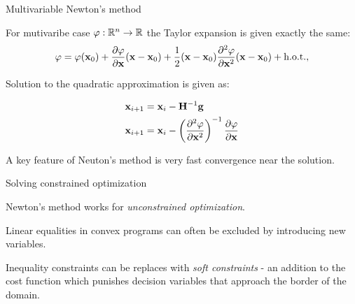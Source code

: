 \documentclass{beamer}
\begin{document}
\begin{frame}{Multivariable Newton's method}
	\begin{flushleft}
		
		For mutivaribe case $\varphi: \mathbb{R}^n \rightarrow \mathbb{R}$ the Taylor expansion is given exactly the same:
		\begin{equation}
			\varphi = \varphi(\mathbf{x}_0) + \frac{\partial \varphi}{\partial \mathbf{x}} (\mathbf{x} - \mathbf{x}_0)
			+ \frac{1}{2} (\mathbf{x} - \mathbf{x}_0) \frac{\partial^2 \varphi}{\partial \mathbf{x}^2} (\mathbf{x} - \mathbf{x}_0)
			+ \text{h.o.t.},
		\end{equation}
		
		Solution to the quadratic approximation is given as:
		
		\begin{align}
			\mathbf{x}_{i+1} &= \mathbf{x}_i  - \mathbf{H}^{-1} \mathbf{g}
			\\
			\mathbf{x}_{i+1} &= \mathbf{x}_i  - \left(\frac{\partial^2 \varphi}{\partial \mathbf{x}^2} \right)^{-1} 
													 \frac{\partial \varphi}{\partial \mathbf{x}} 
		\end{align}
		
		A key feature of Neuton's method is very fast convergence near the solution.
		
	\end{flushleft}
\end{frame}






\begin{frame}{Solving constrained optimization}
	\begin{flushleft}
		
		Newton's method works for \emph{unconstrained optimization}.
		
		\bigskip
		
		Linear equalities in convex programs can often be excluded by introducing new variables.
		
		\bigskip
		
		Inequality constraints can be replaces with \emph{soft constraints} - an addition to the cost function which punishes decision variables that approach the border of the domain. 
		
	\end{flushleft}
\end{frame}
\end{document}
